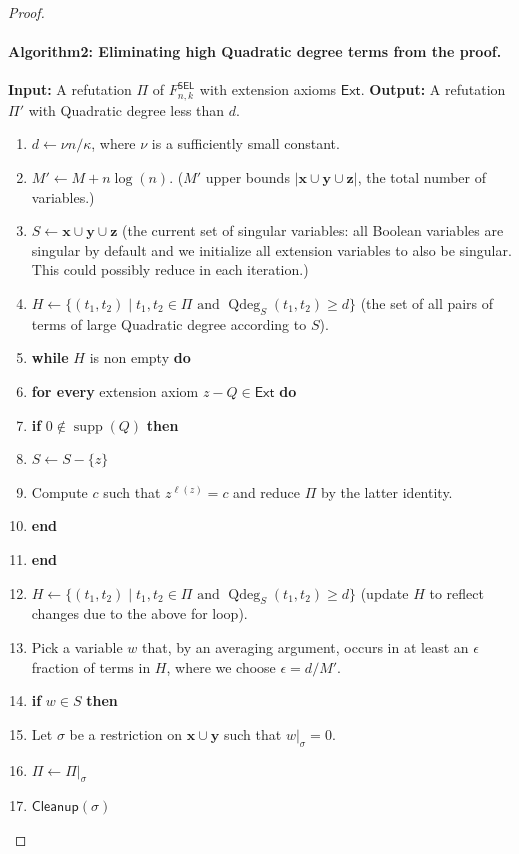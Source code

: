 \documentclass[10pt,a4paper]{article}
\DeclareMathOperator{\supp}{supp}
\DeclareMathOperator{\Qdeg}{Qdeg}
\begin{document}
\begin{proof}
\paragraph{Algorithm2: Eliminating high Quadratic degree terms from the proof.}
\textbf{Input:} A refutation $\Pi$ of $F^{\mathsf{SEL}}_{n,k}$ with extension axioms $\mathsf{Ext}$.
\textbf{Output:} A refutation $\Pi'$ with Quadratic degree less than $d$.
\begin{enumerate}[label=\arabic*,leftmargin=*]
\item $d\leftarrow\nu n/\kappa$, where $\nu$ is a sufficiently small constant.
\item $M'\leftarrow M+n\log(n)$. ($M'$ upper bounds $|\mathbf x\cup\mathbf y\cup\mathbf z|$, the total number of variables.)
\item $S\leftarrow\mathbf x\cup\mathbf y\cup\mathbf z$ (the current set of singular variables: all Boolean variables are singular by default and we initialize all extension variables to also be singular. This could possibly reduce in each iteration.)
\item $H\leftarrow\{(t_1,t_2)\mid t_1,t_2\in\Pi\text{ and }\Qdeg_S(t_1,t_2)\geq d\}$ (the set of all pairs of terms of large Quadratic degree according to $S$).
\item \textbf{while} $H$ is non empty \textbf{do}
\item \textbf{for every} extension axiom $z-Q\in\mathsf{Ext}$ \textbf{do}
\item \textbf{if} $0\notin\supp(Q)$ \textbf{then}
\item $S\leftarrow S-\{z\}$
\item Compute $c$ such that $z^{\ell(z)}=c$ and reduce $\Pi$ by the latter identity.
\item \textbf{end}
\item \textbf{end}
\item $H\leftarrow\{(t_1,t_2)\mid t_1,t_2\in\Pi\text{ and }\Qdeg_S(t_1,t_2)\geq d\}$ (update $H$ to reflect changes due to the above for loop).
\item Pick a variable $w$ that, by an averaging argument, occurs in at least an $\epsilon$ fraction of terms in $H$, where we choose $\epsilon=d/M'$.
\item \textbf{if} $w\in S$ \textbf{then}
\item Let $\sigma$ be a restriction on $\mathbf x\cup\mathbf y$ such that $w|_{\sigma}=0$.
\item $\Pi\leftarrow\Pi|_{\sigma}$
\item $\mathsf{Cleanup}(\sigma)$

\end{enumerate}
\end{proof}
\end{document}
